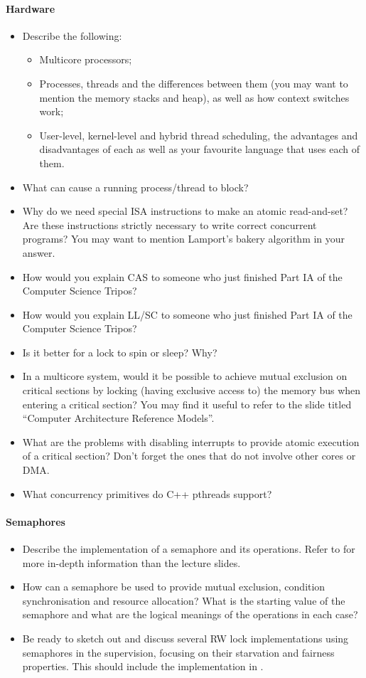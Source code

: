 \documentclass[12pt,a4paper,oneside,openright]{report}
\newcommand{\question}[2]{\paragraph{#1} #2}
\begin{document}
\question{Hardware}{
  \begin{itemize}
  \item Describe the following:
    \begin{itemize}
    \item Multicore processors;
    \item Processes, threads and the differences between them (you may
    want to mention the memory stacks and heap), as well as how
    context switches work;
    \item User-level, kernel-level and hybrid thread scheduling, the
    advantages and disadvantages of each as well as your favourite
    language that uses each of them.
    \end{itemize}
  \item What can cause a running process/thread to block?
  \item Why do we need special ISA instructions to make an atomic
    read-and-set? Are these instructions strictly necessary to write
    correct concurrent programs? You may want to mention Lamport's
    bakery algorithm in your answer.
  \item How would you explain CAS to someone who just finished Part IA
    of the Computer Science Tripos?
  \item How would you explain LL/SC to someone who just finished Part
    IA of the Computer Science Tripos?
  \item Is it better for a lock to spin or sleep? Why?
  \item In a multicore system, would it be possible to achieve mutual
    exclusion on critical sections by locking (having exclusive access
    to) the memory bus when entering a critical section? You may find
    it useful to refer to the slide titled ``Computer Architecture
    Reference Models''.
  \item What are the problems with disabling interrupts to provide
    atomic execution of a critical section? Don't forget the ones that
    do not involve other cores or DMA.
  \item What concurrency primitives do C++ pthreads support?
  \end{itemize}
}

\question{Semaphores}{
  \begin{itemize}
  \item Describe the implementation of a semaphore and its
    operations. Refer to
    \cite[Chapters~10.4--10.6]{bacon2003operating} for more in-depth
    information than the lecture slides.
  \item How can a semaphore be used to provide mutual exclusion,
    condition synchronisation and resource allocation? What is the
    starting value of the semaphore and what are the logical meanings
    of the operations in each case?
  \item Be ready to sketch out and discuss several RW lock
    implementations using semaphores in the supervision, focusing on
    their starvation and fairness properties. This should include the
    implementation in \cite[Chapter~11.5]{bacon2003operating}.
  \end{itemize}
}
\end{document}
